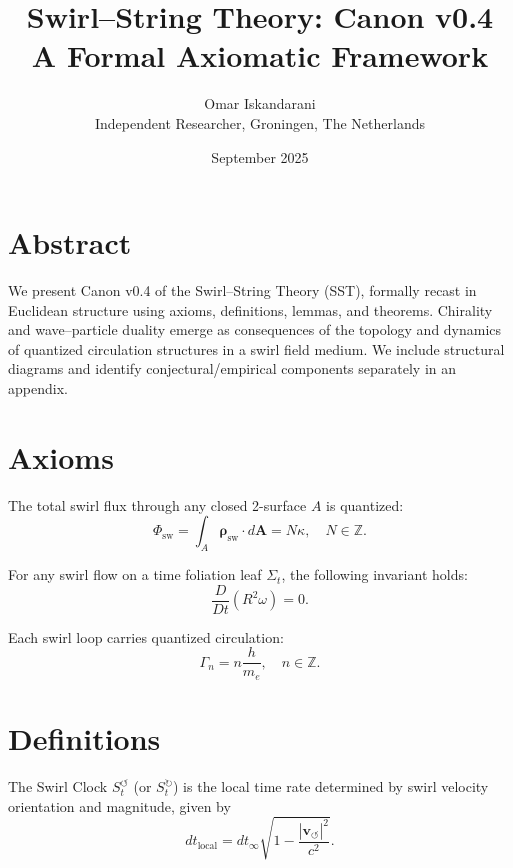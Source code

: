 \documentclass[11pt,a4paper]{article}
\title{Swirl--String Theory: Canon v0.4 \\ \large A Formal Axiomatic Framework}
\author{Omar Iskandarani\\\small Independent Researcher, Groningen, The Netherlands}
\date{September 2025}
\begin{document}
\maketitle

\section*{Abstract}
    We present Canon v0.4 of the Swirl--String Theory (SST), formally recast in Euclidean structure using axioms, definitions, lemmas, and theorems. Chirality and wave--particle duality emerge as consequences of the topology and dynamics of quantized circulation structures in a swirl field medium. We include structural diagrams and identify conjectural/empirical components separately in an appendix.

    \tableofcontents
    \newpage

\section{Axioms}

    \begin{axiom}
    \label{ax:flux-quant}
    The total swirl flux through any closed 2-surface $A$ is quantized:
    \[
        \Phi_{\text{sw}} = \int_A \bm{\rho}_{\text{sw}} \cdot d\bm{A} = N\kappa, \quad N \in \mathbb{Z}.
    \]
    \end{axiom}

    \begin{axiom}
    \label{ax:chronos-kelvin}
    For any swirl flow on a time foliation leaf $\Sigma_t$, the following invariant holds:
    \[
        \frac{D}{Dt}(R^2\omega) = 0.
    \]
    \end{axiom}

    \begin{axiom}
    \label{ax:circulation}
    Each swirl loop carries quantized circulation:
    \[
        \Gamma_n = n\frac{h}{m_e}, \quad n \in \mathbb{Z}.
    \]
    \end{axiom}

\section{Definitions}

    \begin{definition}
    \label{def:swirl-clock}
    The Swirl Clock $S_t^{\circlearrowleft}$ (or $S_t^{\circlearrowright}$) is the local time rate determined by swirl velocity orientation and magnitude, given by
    \[
        dt_{\text{local}} = dt_{\infty} \sqrt{1 - \frac{|\bm{v}_{\circlearrowleft}|^2}{c^2}}.
    \]
    \end{definition}
\end{document}
